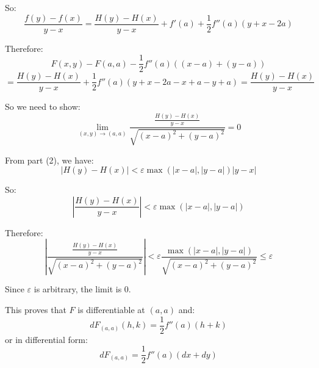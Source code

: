 \documentclass[12pt]{article}
\begin{document}
\begin{correctionbox}
So:
$$\frac{f(y) - f(x)}{y - x} = \frac{H(y) - H(x)}{y - x} + f'(a) + \frac{1}{2}f''(a)(y + x - 2a)$$

Therefore:
$$F(x,y) - F(a,a) - \frac{1}{2}f''(a)((x-a) + (y-a))$$
$$= \frac{H(y) - H(x)}{y - x} + \frac{1}{2}f''(a)(y + x - 2a - x + a - y + a) = \frac{H(y) - H(x)}{y - x}$$

So we need to show:
$$\lim_{(x,y)\to(a,a)} \frac{\frac{H(y) - H(x)}{y - x}}{\sqrt{(x-a)^2 + (y-a)^2}} = 0$$

From part (2), we have:
$$|H(y) - H(x)| < \varepsilon \max(|x - a|, |y - a|) |y - x|$$

So:
$$\left|\frac{H(y) - H(x)}{y - x}\right| < \varepsilon \max(|x - a|, |y - a|)$$

Therefore:
$$\left|\frac{\frac{H(y) - H(x)}{y - x}}{\sqrt{(x-a)^2 + (y-a)^2}}\right| < \varepsilon \frac{\max(|x - a|, |y - a|)}{\sqrt{(x-a)^2 + (y-a)^2}} \leq \varepsilon$$

Since $\varepsilon$ is arbitrary, the limit is 0.

This proves that $F$ is differentiable at $(a,a)$ and:
$$dF_{(a,a)}(h,k) = \frac{1}{2}f''(a)(h + k)$$
or in differential form:
$$dF_{(a,a)} = \frac{1}{2}f''(a)(dx + dy)$$
\end{correctionbox}
\end{document}
